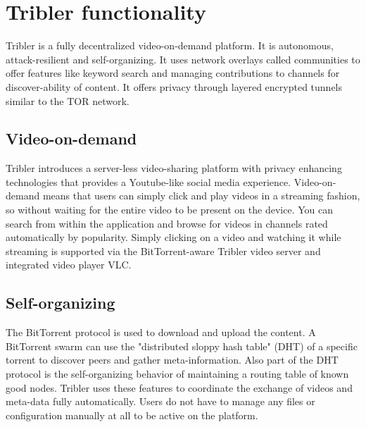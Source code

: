 \chapter{Tribler functionality}
\label{ch:tribler}

Tribler is a fully decentralized video-on-demand platform. \cite{TriblerOverviewJournal, tribler2014play, tribler-anon-hd}
It is autonomous, attack-resilient and self-organizing. \cite{votecast, tribler-gossip}
It uses network overlays called communities to offer features like keyword search and managing contributions to channels for discover-ability of content.
It offers privacy through layered encrypted tunnels similar to the TOR network.\cite{triber2014at3, dingledine2004tor, dingledine2006design}


\section{Video-on-demand}


Tribler introduces a server-less video-sharing platform with privacy enhancing technologies that provides a Youtube-like social media experience.
Video-on-demand means that users can simply click and play videos in a streaming fashion, so without waiting for the entire video to be present on the device. %
You can search from within the application and browse for videos in channels rated automatically by popularity.
Simply clicking on a video and watching it while streaming is supported via the BitTorrent-aware Tribler video server and integrated video player VLC.


\section{Self-organizing}

The BitTorrent protocol is used to download and upload the content.
A BitTorrent swarm can use the "distributed sloppy hash table" (DHT) of a specific torrent to discover peers and gather meta-information.
Also part of the DHT protocol is the self-organizing behavior of maintaining a routing table of known good nodes.
Tribler uses these features to coordinate the exchange of videos and meta-data fully automatically.
Users do not have to manage any files or configuration manually at all to be active on the platform.


